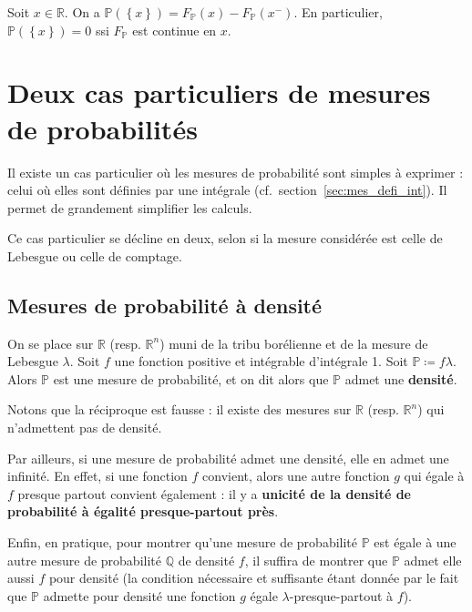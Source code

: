 \documentclass[../integ-proba.tex]{subfiles}
\begin{document}
    \begin{cor}
        Soit $x \in \mathbb{R}$.
        On a $\mathbb{P}(\left\{x\right\}) = F_\mathbb{P}(x) - F_\mathbb{P}(x^-)$.
        En particulier, $\mathbb{P}(\left\{x\right\}) = 0$ ssi $F_\mathbb{P}$ est continue en $x$.
    \end{cor}

    \section{Deux cas particuliers de mesures de probabilités}
    \label{sec:probas_mes_particulieres}

    Il existe un cas particulier où les mesures de probabilité sont simples à exprimer : celui où elles sont définies par une intégrale (cf.\ section~\ref{sec:mes_defi_int}).
    Il permet de grandement simplifier les calculs.

    Ce cas particulier se décline en deux, selon si la mesure considérée est celle de Lebesgue ou celle de comptage.

    \subsection{Mesures de probabilité à densité}
    \begin{defi}
        On se place sur $\mathbb{R}$ (resp. $\mathbb{R}^n$) muni de la tribu borélienne et de la mesure de Lebesgue $\lambda$.
        Soit $f$ une fonction positive et intégrable d'intégrale 1.
        Soit $\mathbb{P}\coloneqq f \lambda$.
        Alors $\mathbb{P}$ est une mesure de probabilité, et on dit alors que $\mathbb{P}$ admet une \textbf{densité}.
    \end{defi}

    \begin{rem}
        Notons que la réciproque est fausse : il existe des mesures sur $\mathbb{R}$ (resp. $\mathbb{R}^n$) qui n'admettent pas de densité.

        Par ailleurs, si une mesure de probabilité admet une densité, elle en admet une infinité.
        En effet, si une fonction $f$ convient, alors une autre fonction $g$ qui égale à $f$ presque partout convient également : il y a \textbf{unicité de la densité de probabilité à égalité presque-partout près}. %

        Enfin, en pratique, pour montrer qu'une mesure de probabilité $\mathbb{P}$ est égale à une autre mesure de probabilité $\mathbb{Q}$ de densité $f$, il suffira de montrer que $\mathbb{P}$ admet elle aussi $f$ pour densité (la condition nécessaire et suffisante étant donnée par le fait que $\mathbb{P}$ admette pour densité une fonction $g$ égale $\lambda$-presque-partout à $f$).
    \end{rem}
\end{document}
